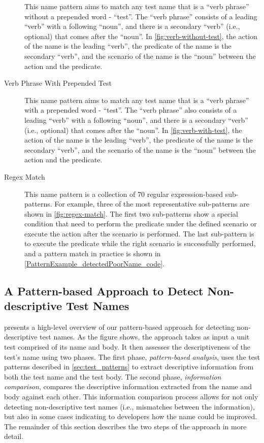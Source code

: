 \documentclass[proposal.tex]{subfiles}
\begin{document}
\begin{description}
This name pattern aims to match any test name that is a \enquote{verb phrase} without a prepended word - \enquote{test}.
%
The \enquote{verb phrase} consists of a leading \enquote{verb} with a following \enquote{noun}, and there is a secondary \enquote{verb} (i.e., optional) that comes after the \enquote{noun}.
%
In \cref{fig:verb-without-test}, the action of the name is the leading \enquote{verb}, the predicate of the name is the secondary \enquote{verb}, and the scenario of the name is the \enquote{noun} between the action and the predicate.

\item[Verb Phrase With Prepended Test]

This name pattern aims to match any test name that is a \enquote{verb phrase} with a prepended word - \enquote{test}.
%
The \enquote{verb phrase} also consists of a leading \enquote{verb} with a following \enquote{noun}, and there is a secondary \enquote{verb} (i.e., optional) that comes after the \enquote{noun}.
%
In \cref{fig:verb-with-test}, the action of the name is the leading \enquote{verb}, the predicate of the name is the secondary \enquote{verb}, and the scenario of the name is the \enquote{noun} between the action and the predicate.

\item[Regex Match]

This name pattern is a collection of \num{70} regular expression-based sub-patterns.
%
For example, three of the most representative sub-patterns are shown in \cref{fig:regex-match}.
%
The first two sub-patterns show a special condition that need to perform the predicate under the defined scenario or execute the action after the scenario is performed.
%
The last sub-pattern is to execute the predicate while the right scenario is successfully performed, and a pattern match in practice is shown in \cref{PatternExample_detectedPoorName_code}.

\end{description}

\subsection{A Pattern-based Approach to Detect Non-descriptive Test Names}
\label{sec:approach}

 presents a high-level overview of our pattern-based approach for detecting non-descriptive test names.
%
As the figure shows, the approach takes as input a unit test comprised of its name and body.
%
It then assesses the descriptiveness of the test's name using two phases.
%
The first phase, \emph{pattern-based analysis}, uses the test patterns described in \cref{sec:test_patterns} to extract descriptive information from both the test name and the test body.
%
The second phase, \emph{information comparison}, compares the descriptive information extracted from the name and body against each other.
%
This information comparison process allows for not only detecting non-descriptive test names (i.e., mismatches between the information), but also in some cases indicating to developers how the name could be improved.
%
The remainder of this section describes the two steps of the approach in more detail.
\end{document}
